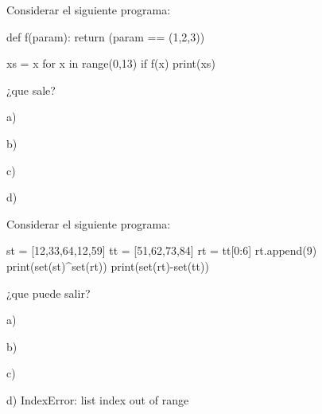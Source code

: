 \begin{exercise}
Considerar el siguiente programa: 

\begin{small}
\begin{python}
def f(param):
    return (param == (1,2,3))
    
xs = {x for x in range(0,13) if f(x)}
print(xs)
\end{python}
\end{small} 

¿que sale?

a)  %

b) \pythoninline{\{\}}

c) 

 d) 

\end{exercise}

\newpage 

\begin{exercise}
Considerar el siguiente programa: 

\begin{small}
\begin{python}
st = [12,33,64,12,59]
tt = [51,62,73,84]
rt = tt[0:6]
rt.append(9)
print(set(st)^set(rt))
print(set(rt)-set(tt))
\end{python}
\end{small} 

¿que puede salir?


a) 
\\ %

b)  
\\

c)  
\\

d)  IndexError: list index out of range

\end{exercise}




